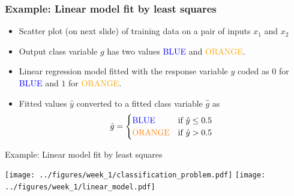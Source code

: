 \documentclass[notes]{beamer}          %
\newcommand{\vect}[1]{\bm{#1}}
\newcommand{\field}[1]{\mathbb{#1}}
\newcommand{\R}{\field{R}}
\newif\iffull
\begin{document}
\begin{frame}
\frametitle{Example: Linear model fit by least squares}
\begin{itemize}
    \item Scatter plot (on next slide) of training data on a pair of inputs $x_1$ and $x_2$
    \item Output class variable $g$ has two values \textcolor{blue}{BLUE} and \textcolor{orange}{ORANGE}.
    \item Linear regression model fitted with the response variable $y$ coded as $0$ for \textcolor{blue}{BLUE} and $1$ for \textcolor{orange}{ORANGE}.
    \item Fitted values $\hat{y}$ converted to a fitted class variable $\hat{g}$ as
    \[ \hat{g} = \begin{cases}
                    \text{\textcolor{blue}{BLUE}}  & \text{if $\hat{y} \leq 0.5$} \\
                    \text{\textcolor{orange}{ORANGE}} & \text{if $\hat{y} > 0.5$ }
                 \end{cases} \]

\end{itemize}
\end{frame}

\begin{frame}{Example: Linear model fit by least squares}
    \begin{center}
        \texttt{[image: ../figures/week\_1/classification\_problem.pdf]}
        \hfill
        \texttt{[image: ../figures/week\_1/linear\_model.pdf]}
        \end{center}
\end{frame}

\iffull
\begin{frame}
\frametitle{Example: Linear model fit by least squares}
\begin{itemize}
    \item Two classes separated in the plane ($\R^2$) by the decision boundary $\{ \vect{x} : \vect{w}^T\vect{x} = 0.5 \}$
    \item $\{ \vect{x} : \vect{w}^T\vect{x} < 0.5 \}$ set of \textcolor{blue}{BLUE} points
    \item $\{ \vect{x} : \vect{w}^T\vect{x} \geq 0.5 \}$ set of \textcolor{orange}{ORANGE} points

\end{itemize}
\end{frame}
\fi
\end{document}
